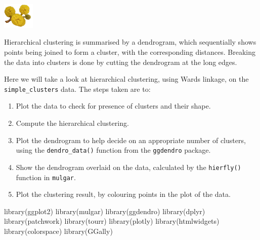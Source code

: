 \documentclass[
  letterpaper,
]{krantz}
\newenvironment{Shaded}{\begin{snugshade}}{\end{snugshade}}
\newcommand{\FunctionTok}[1]{\textcolor[rgb]{0.28,0.35,0.67}{#1}}
\newcommand{\NormalTok}[1]{\textcolor[rgb]{0.00,0.23,0.31}{#1}}
\providecommand{\tightlist}{%
  \setlength{\itemsep}{0pt}\setlength{\parskip}{0pt}}\usepackage{longtable,booktabs,array}
\newcommand{\infobox}[1]{%
\noindent\colorbox{info!30}{%
\begin{minipage}{0.98\linewidth}%
    \centering%
    \begin{minipage}[c]{0.15\linewidth} %
      \includegraphics[width=1.5cm]{images/mulga-flowers2.png} %
    \end{minipage}%
    \hfill %
    \begin{minipage}[c]{0.8\linewidth} %
      \bigskip%
      \textsf{#1}%
      \bigskip%
    \end{minipage}%
    \hspace*{3mm}%
  \end{minipage}%
}%
}
\begin{document}
\infobox{Hierarchical clustering is summarised by a dendrogram, which sequentially shows points being joined to form a cluster, with the corresponding distances. Breaking the data into clusters is done by cutting the dendrogram at the long edges.}

Here we will take a look at hierarchical clustering, using Wards
linkage, on the \texttt{simple\_clusters} data. The steps taken are to:

\begin{enumerate}
\def\labelenumi{\arabic{enumi}.}
\tightlist
\item
  Plot the data to check for presence of clusters and their shape.
\item
  Compute the hierarchical clustering.
\item
  Plot the dendrogram to help decide on an appropriate number of
  clusters, using the \texttt{dendro\_data()} function from the
  \texttt{ggdendro} package.
\item
  Show the dendrogram overlaid on the data, calculated by the
  \texttt{hierfly()} function in \texttt{mulgar}.
\item
  Plot the clustering result, by colouring points in the plot of the
  data.
\end{enumerate}


\begin{Shaded}
\begin{Highlighting}[]
\FunctionTok{library}\NormalTok{(ggplot2)}
\FunctionTok{library}\NormalTok{(mulgar)}
\FunctionTok{library}\NormalTok{(ggdendro)}
\FunctionTok{library}\NormalTok{(dplyr)}
\FunctionTok{library}\NormalTok{(patchwork)}
\FunctionTok{library}\NormalTok{(tourr)}
\FunctionTok{library}\NormalTok{(plotly)}
\FunctionTok{library}\NormalTok{(htmlwidgets)}
\FunctionTok{library}\NormalTok{(colorspace)}
\FunctionTok{library}\NormalTok{(GGally)}
\end{Highlighting}
\end{Shaded}
\end{document}
